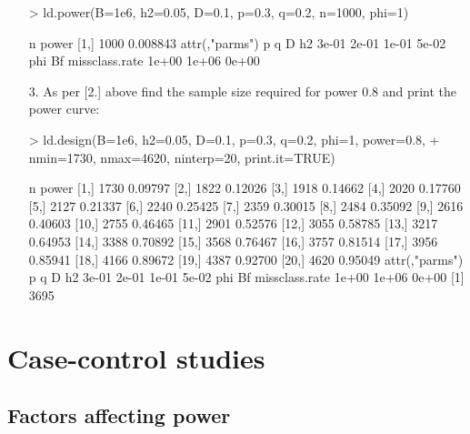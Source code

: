 \documentclass[a4paper,10pt]{amsart}
\begin{document}
\begin{itemize}
\begin{Schunk}
\begin{Sinput}
> ld.power(B=1e6, h2=0.05, D=0.1, p=0.3, q=0.2, n=1000, phi=1)
\end{Sinput}
\begin{Soutput}
        n    power
[1,] 1000 0.008843
attr(,"parms")
             p              q              D             h2 
         3e-01          2e-01          1e-01          5e-02 
           phi             Bf missclass.rate 
         1e+00          1e+06          0e+00 
\end{Soutput}
\end{Schunk}
\item[3.] As per [2.] above find the sample size required for power 0.8 and print the
power curve:
\begin{Schunk}
\begin{Sinput}
> ld.design(B=1e6, h2=0.05, D=0.1, p=0.3, q=0.2, phi=1, power=0.8, 
+           nmin=1730, nmax=4620, ninterp=20, print.it=TRUE)
\end{Sinput}
\begin{Soutput}
         n   power
 [1,] 1730 0.09797
 [2,] 1822 0.12026
 [3,] 1918 0.14662
 [4,] 2020 0.17760
 [5,] 2127 0.21337
 [6,] 2240 0.25425
 [7,] 2359 0.30015
 [8,] 2484 0.35092
 [9,] 2616 0.40603
[10,] 2755 0.46465
[11,] 2901 0.52576
[12,] 3055 0.58785
[13,] 3217 0.64953
[14,] 3388 0.70892
[15,] 3568 0.76467
[16,] 3757 0.81514
[17,] 3956 0.85941
[18,] 4166 0.89672
[19,] 4387 0.92700
[20,] 4620 0.95049
attr(,"parms")
             p              q              D             h2 
         3e-01          2e-01          1e-01          5e-02 
           phi             Bf missclass.rate 
         1e+00          1e+06          0e+00 
[1] 3695
\end{Soutput}
\end{Schunk}
\end{itemize}

\section{Case-control studies}

\subsection{Factors affecting power}
\end{document}
